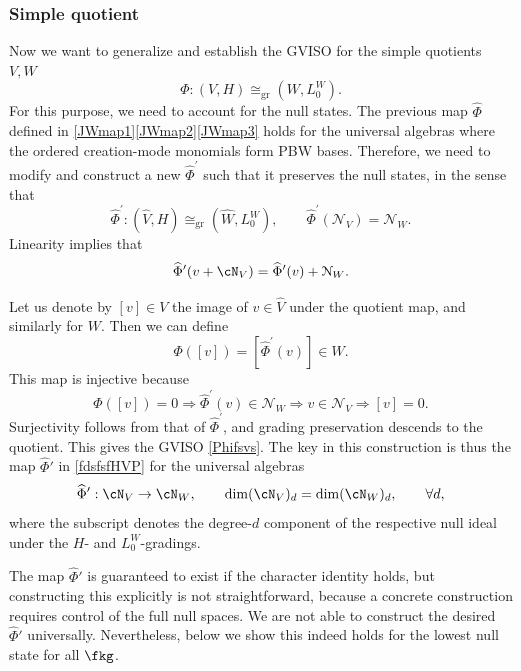 \documentclass[a4paper,11pt]{article}
\theoremstyle{definition}
\theoremstyle{definition}
\theoremstyle{remark}
\newcommand{\be}{\begin{equation}}
\newcommand{\ee}{\end{equation}}
\begin{document}
\subsubsection{Simple quotient  }


Now we want to generalize and establish the GVISO for the simple quotients $V,W$
\be \label{Phifsvs}
 \Phi:
(  V,H)\cong_{\mathrm{gr}}
(  W,L^W_0).
\ee
For this purpose,    we need to account for the null states. The previous map $\widehat \Phi$ defined in \eqref{JWmap1}\eqref{JWmap2}\eqref{JWmap3} holds for the universal algebras where  the  ordered creation-mode monomials
form PBW bases.  Therefore, we need to modify and construct a new $\widehat \Phi^\prime$ such that it preserves the null states, in the sense that
%
\be\label{fdsfsfHVP}
\widehat\Phi^{\prime}:
(\widehat V,H)\cong _{\mathrm{gr}}(\widehat W,L^W_0),
\qquad
\widehat\Phi^{\prime}(\mathcal N_V)=\mathcal N_W.
\ee
 Linearity implies that 
\be
\widehat\Phi^{\prime}(v+\cN_V)=\widehat\Phi^{\prime}(v)+\mathcal N_W.
\ee
 
Let us  denote by $[v]\in V$ the image of $v\in \widehat V$ under the quotient map, and similarly for $W$. Then we can define
\be\label{Phisfsfsf}
\Phi([v])=[\widehat\Phi^{\prime}(v)]\in   W .
\ee
This map is injective because
\be
\Phi([v])=0
\Longrightarrow
\widehat\Phi^{\prime}(v)\in\mathcal N_W
\Longrightarrow
v\in\mathcal N_V
\Longrightarrow
[v]=0.
\ee
Surjectivity follows from that of $\widehat\Phi^{\prime}$, and grading preservation descends to the quotient. This gives the GVISO \eqref{Phifsvs}.
 The key in this construction is thus the map $\widehat\Phi'$ in \eqref{fdsfsfHVP} for the universal algebras
\be\label{widhefafsffsd}
 \widehat\Phi': \cN_V\to \cN_W,\qquad \dim (\cN_V)_d=\dim (\cN_W)_d,\qquad \forall d,
\ee
where the subscript denotes the degree-$d$ component of the respective null ideal under the $H$- and $L_0^W$-gradings.

 
The map $\widehat \Phi'$ is guaranteed to exist if the character identity holds, but constructing this explicitly is not straightforward, because a concrete construction requires control of the full
null spaces. We are not able to construct the desired  $\widehat \Phi'$ universally. Nevertheless, below we   show this indeed holds for the lowest null state for all $\fkg$. 
 
\end{document}
